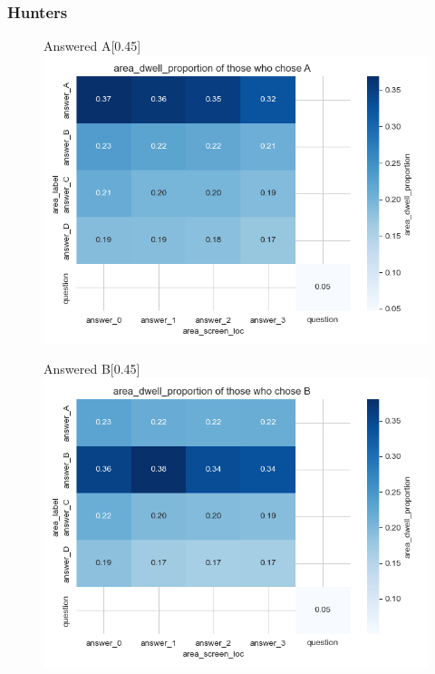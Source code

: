 \documentclass{article}
\begin{document}
\subsubsection{Hunters}

\begin{figure}[H]
  \centering
  \begin{subcaptionbox}{Answered A\label{fig:A_dp_h}}[0.45\textwidth]
    {\centering\includegraphics[width=\linewidth]{plots/matrix_plots/matrix_area_dwell_proportion_A_hunters.png}}
  \end{subcaptionbox}
  \hfill
  \begin{subcaptionbox}{Answered B\label{fig:B_dp_h}}[0.45\textwidth]
    {\centering\includegraphics[width=\linewidth]{plots/matrix_plots/matrix_area_dwell_proportion_B_hunters.png}}
  \end{subcaptionbox}
  

\end{figure}
\end{document}
